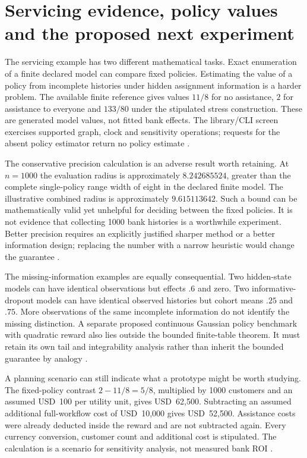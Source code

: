 \section{Servicing evidence, policy values and the proposed next experiment}
\label{exec14:servicing-evidence}

The servicing example has two different mathematical tasks. Exact enumeration
of a finite declared model can compare fixed policies. Estimating the value of
a policy from incomplete histories under hidden assignment information is a
harder problem. The available finite reference gives values $11/8$ for no
assistance, $2$ for assistance to everyone and $133/80$ under the stipulated
stress construction. These are generated model values, not fitted bank effects.
The library/CLI screen exercises supported graph, clock and sensitivity
operations; requests for the absent policy estimator return no policy estimate
\citep{exec14_servicing_evidence}.

The conservative precision calculation is an adverse result worth retaining.
At $n=1000$ the evaluation radius is approximately $8.242685524$, greater than
the complete single-policy range width of eight in the declared finite model.
The illustrative combined radius is approximately $9.615113642$. Such a bound
can be mathematically valid yet unhelpful for deciding between the fixed
policies. It is not evidence that collecting 1000 bank histories is a worthwhile
experiment. Better precision requires an explicitly justified sharper method
or a better information design; replacing the number with a narrow heuristic
would change the guarantee \citep{exec14_servicing_evidence}.

The missing-information examples are equally consequential. Two hidden-state
models can have identical observations but effects $.6$ and zero. Two
informative-dropout models can have identical observed histories but cohort
means $.25$ and $.75$. More observations of the same incomplete information do
not identify the missing distinction. A separate proposed continuous Gaussian
policy benchmark with quadratic reward also lies outside the bounded
finite-table theorem. It must retain its own tail and integrability analysis
rather than inherit the bounded guarantee by analogy
\citep{exec14_servicing_evidence}.

A planning scenario can still indicate what a prototype might be worth studying.
The fixed-policy contrast $2-11/8=5/8$, multiplied by 1000 customers and an
assumed USD~100 per utility unit, gives USD~62,500. Subtracting an assumed
additional full-workflow cost of USD~10,000 gives USD~52,500. Assistance costs
were already deducted inside the reward and are not subtracted again. Every
currency conversion, customer count and additional cost is stipulated. The
calculation is a scenario for sensitivity analysis, not measured bank ROI
\citep{exec14_servicing_evidence}.

